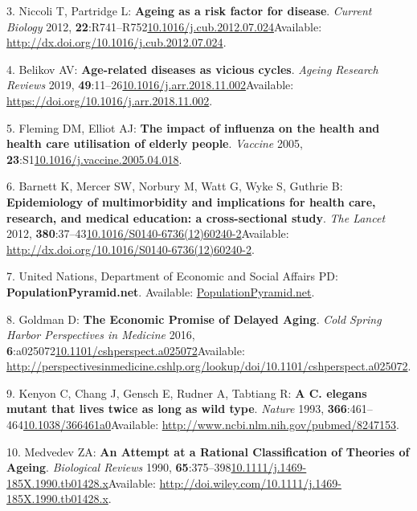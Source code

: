 \documentclass[
]{book}
\begin{document}
\leavevmode\hypertarget{ref-Niccoli2012}{}%
3. Niccoli T, Partridge L: \textbf{Ageing as a risk factor for disease}. \emph{Current Biology} 2012, \textbf{22}:R741--R752\href{https://doi.org/10.1016/j.cub.2012.07.024}{10.1016/j.cub.2012.07.024}Available: \url{http://dx.doi.org/10.1016/j.cub.2012.07.024}.

\leavevmode\hypertarget{ref-Belikov2019}{}%
4. Belikov AV: \textbf{Age-related diseases as vicious cycles}. \emph{Ageing Research Reviews} 2019, \textbf{49}:11--26\href{https://doi.org/10.1016/j.arr.2018.11.002}{10.1016/j.arr.2018.11.002}Available: \url{https://doi.org/10.1016/j.arr.2018.11.002}.

\leavevmode\hypertarget{ref-Fleming2005}{}%
5. Fleming DM, Elliot AJ: \textbf{The impact of influenza on the health and health care utilisation of elderly people}. \emph{Vaccine} 2005, \textbf{23}:S1\href{https://doi.org/10.1016/j.vaccine.2005.04.018}{10.1016/j.vaccine.2005.04.018}.

\leavevmode\hypertarget{ref-Barnett2012}{}%
6. Barnett K, Mercer SW, Norbury M, Watt G, Wyke S, Guthrie B: \textbf{Epidemiology of multimorbidity and implications for health care, research, and medical education: a cross-sectional study}. \emph{The Lancet} 2012, \textbf{380}:37--43\href{https://doi.org/10.1016/S0140-6736(12)60240-2}{10.1016/S0140-6736(12)60240-2}Available: \url{http://dx.doi.org/10.1016/S0140-6736(12)60240-2}.

\leavevmode\hypertarget{ref-PopulationPyramid2019}{}%
7. United Nations, Department of Economic and Social Affairs PD: \textbf{PopulationPyramid.net}. Available: \url{PopulationPyramid.net}.

\leavevmode\hypertarget{ref-Goldman2016}{}%
8. Goldman D: \textbf{The Economic Promise of Delayed Aging}. \emph{Cold Spring Harbor Perspectives in Medicine} 2016, \textbf{6}:a025072\href{https://doi.org/10.1101/cshperspect.a025072}{10.1101/cshperspect.a025072}Available: \url{http://perspectivesinmedicine.cshlp.org/lookup/doi/10.1101/cshperspect.a025072}.

\leavevmode\hypertarget{ref-Kenyon1993}{}%
9. Kenyon C, Chang J, Gensch E, Rudner A, Tabtiang R: \textbf{A C. elegans mutant that lives twice as long as wild type}. \emph{Nature} 1993, \textbf{366}:461--464\href{https://doi.org/10.1038/366461a0}{10.1038/366461a0}Available: \url{http://www.ncbi.nlm.nih.gov/pubmed/8247153}.

\leavevmode\hypertarget{ref-Medvedev1990}{}%
10. Medvedev ZA: \textbf{An Attempt at a Rational Classification of Theories of Ageing}. \emph{Biological Reviews} 1990, \textbf{65}:375--398\href{https://doi.org/10.1111/j.1469-185X.1990.tb01428.x}{10.1111/j.1469-185X.1990.tb01428.x}Available: \url{http://doi.wiley.com/10.1111/j.1469-185X.1990.tb01428.x}.
\end{document}
